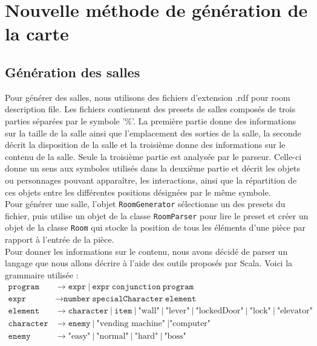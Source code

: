 \documentclass[10pt,a4paper]{article}
\begin{document}
\section{Nouvelle méthode de génération de la carte}
\subsection{Génération des salles}

Pour générer des salles, nous utilisons des fichiers d'extension .rdf pour room description file. Les fichiers contiennent des presets de salles composés de trois parties séparées par le symbole '\%'. La première partie donne des informations sur la taille de la salle ainsi que l'emplacement des sorties de la salle, la seconde décrit la disposition de la salle et la troisième donne des informations sur le contenu de la salle. Seule la troisième partie est analysée par le parseur. Celle-ci donne un sens aux symboles utilisés dans la deuxième partie et décrit les objets ou personnages pouvant apparaître, les interactions, ainsi que la répartition de ces objets entre les différentes positions désignées par le même symbole.\\
Pour générer une salle, l'objet \texttt{RoomGenerator} sélectionne un des presets du fichier, puis utilise un objet de la classe \texttt{RoomParser} pour lire le preset et créer un objet de la classe \texttt{Room} qui stocke la position de tous les éléments d'une pièce par rapport à l'entrée de la pièce.\\
Pour donner les informations sur le contenu, nous avons décidé de parser un langage que nous allons décrire à l'aide des outils proposés par Scala. Voici la grammaire utilisée :\\
\begin{align*}
	\texttt{program}   & \to \texttt{expr}\ |\ \texttt{expr}\ \texttt{conjunction}\ \texttt{program}                                                                   \\
	\texttt{expr}      & \to \texttt{number}\ \texttt{specialCharacter}\ \texttt{element}                                                                              \\
	\texttt{element}   & \to \texttt{character}\ |\ \texttt{item}\ |\ \mbox{"wall"}\ |\ \mbox{"lever"}\ |\ \mbox{"lockedDoor"}\ |\ \mbox{"lock"}\ |\ \mbox{"elevator"} \\
	\texttt{character} & \to \texttt{enemy}\ |\ \mbox{"vending machine"}\ | \mbox{"computer"}                                                                          \\
	\texttt{enemy}     & \to \mbox{"easy"}\ |\ \mbox{"normal"}\ |\ \mbox{"hard"}\ |\ \mbox{"boss"}                                                                     \\
\end{align*}
\end{document}

